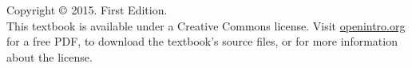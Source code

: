 \chapter*{}
\vfill

\noindent Copyright $\copyright$ 2015. First Edition. \\

\noindent This textbook is available under a Creative Commons license. Visit \href{http://www.openintro.org/stat/textbook.php}{openintro.org} for a free PDF, to download the textbook's source files, or for more information about the license. \\


